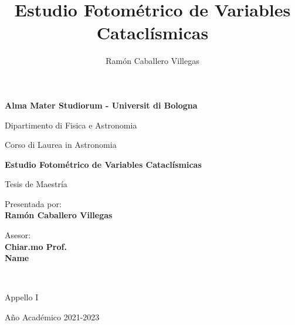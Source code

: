 


\title{Estudio Fotométrico de Variables Cataclísmicas}
\author{Ramón Caballero Villegas}

\begin{titlepage}
    \begin{center}
        \vspace*{0.2cm}
        {\fontsize{19pt}{20pt}\selectfont \textbf{Alma Mater Studiorum - Universit{\ag} di Bologna}\par}
    
        \noindent\hrulefill
        \vspace{0.8cm}
        
        \Large
        
        Dipartimento di Fisica e Astronomia
        
        Corso di Laurea in Astronomia
        
        \Large
        \vspace{5cm}
        {\fontsize{22.5pt}{22.5}\textcolor{MyDarkBlue}{\textbf{Estudio Fotométrico de Variables Cataclísmicas}}}

        
        \vspace{1cm}
        {\fontsize{16pt}{16pt}Tesis de Maestría}
        
        \vspace{4.5cm}
        \begin{minipage}[t]{0.34\textwidth}
        \begin{flushleft}
        {\fontsize{16pt}{16pt}Presentada por: \\ \textbf{\textcolor{MyDarkBlue}{Ramón Caballero Villegas}}}
        \end{flushleft}
        \end{minipage}
        \begin{minipage}[t]{0.64\textwidth}
        \begin{flushright} \Large
        Asesor: \\
        \textbf{\textcolor{MyDarkBlue}{Chiar.mo Prof.}} 
		\\\textbf{\textcolor{MyDarkBlue}{Name}} 
        \end{flushright}
        \end{minipage}\\
        
        \vfill
        \noindent\hrulefill
        \vspace{0.3cm}
        \Large
        
        Appello {\textcolor{MyDarkBlue} {I}} 
        
        Año Académico {\textcolor{MyDarkBlue} {2021-2023}}
    \end{center}
\end{titlepage}
